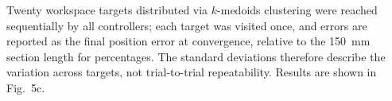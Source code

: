 Twenty workspace targets distributed via $k$-medoids clustering were reached sequentially by all controllers; each target was visited once, and errors are reported as the final position error at convergence, relative to the 150~mm section length for percentages. The standard deviations therefore describe the variation across targets, not trial-to-trial repeatability. Results are shown in Fig.~5c.
